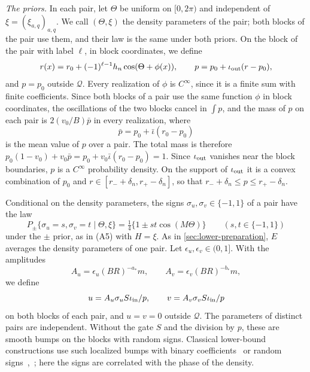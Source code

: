 \emph{The priors.} In each pair, let $\Theta$ be uniform on $[0,2\pi)$
and independent of $\xi=(\xi_{a,q})_{a,q}$. We call $(\Theta,\xi)$ the
density parameters of the pair; both blocks of the pair use them, and
their law is the same under both priors. On the block of the pair with
label $\ell$, in block coordinates, we define
\[
 r(x)=r_0+(-1)^{\ell-1}h_n\cos(\Theta+\phi(x)),\qquad
 p=p_0+\iota_{\rm out}(r-p_0),
\]
and $p=p_0$ outside $\mathcal Q$. Every realization of $\phi$ is
$C^\infty$, since it is a finite sum with finite coefficients. Since
both blocks of a pair use the same function $\phi$ in block coordinates,
the oscillations of the two blocks cancel in $\int p$, and the mass of
$p$ on each pair is $2(v_0/B)\bar p$ in every realization, where
\[
 \bar p=p_0+\bar\iota(r_0-p_0)
\]
is the mean value of $p$ over a pair. The total mass is therefore
$p_0(1-v_0)+v_0\bar p=p_0+v_0\bar\iota(r_0-p_0)=1$. Since
$\iota_{\rm out}$ vanishes near the block boundaries, $p$ is a
$C^\infty$ probability density. On the support of $\iota_{\rm out}$ it
is a convex combination of $p_0$ and $r\in[r_-+\delta_n,r_+-\delta_n]$,
so that $r_-+\delta_n\le p\le r_+-\delta_n$.

Conditional on the density parameters, the signs
$\sigma_u,\sigma_v\in\{-1,1\}$ of a pair have the law
\[
 P_\pm\{\sigma_u=s,\sigma_v=t\mid\Theta,\xi\}
 =\tfrac14\{1\pm st\cos(M\Theta)\}\qquad(s,t\in\{-1,1\})
\]
under the $\pm$ prior, as in (A5) with $H=\xi$. As in
\cref{sec:lower-preparation}, $E$ averages the density parameters
of one pair. Let
$\epsilon_u,\epsilon_v\in(0,1]$. With the amplitudes
\begin{equation}\label{eq:lattice-amplitudes}
 A_u=\epsilon_u(BR)^{-a_*}m,\qquad A_v=\epsilon_v(BR)^{-b_*}m,
\end{equation}
we define
\begin{equation}\label{lat:profiles}
 u=A_u\sigma_uS\iota_{\rm in}/p,\qquad
 v=A_v\sigma_vS\iota_{\rm in}/p
\end{equation}
on both blocks of each pair, and $u=v=0$ outside $\mathcal Q$. The
parameters of distinct pairs are independent. Without the gate $S$ and
the division by $p$, these are smooth bumps on the blocks with random
signs. Classical lower-bound constructions use such localized bumps
with binary coefficients~\cite[Section~2, p.~1045]{stone} or random
signs~\cite[Section~3.5.2]{ingster},~\cite[Sections~3--4]{robins2009};
here the signs are correlated with the phase of the density.

